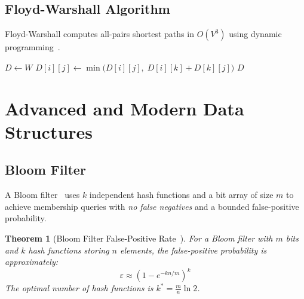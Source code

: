 \documentclass[12pt,a4paper]{article}
\newtheorem{theorem}{Theorem}[section]
\begin{document}
\subsection{Floyd-Warshall Algorithm}

Floyd-Warshall computes all-pairs shortest paths in $O(V^3)$
using dynamic programming~\cite{floyd1962,cormen2022}.

\begin{algorithm}
\caption{Floyd-Warshall All-Pairs Shortest Paths~\cite{floyd1962}}
\begin{algorithmic}[1]
  
  \State $D \leftarrow W$
        \State $D[i][j] \leftarrow \min\!\bigl(D[i][j],\; D[i][k] + D[k][j]\bigr)$
      \EndFor
    \EndFor
  \EndFor
  \Return $D$
\EndProcedure
\end{algorithmic}
\end{algorithm}


\section{Advanced and Modern Data Structures}

\subsection{Bloom Filter}

A Bloom filter~\cite{bloom1970} uses $k$ independent hash functions and a bit array
of size $m$ to achieve membership queries with \emph{no false negatives} and
a bounded false-positive probability.

\begin{theorem}[Bloom Filter False-Positive Rate~\cite{bloom1970}]
For a Bloom filter with $m$ bits and $k$ hash functions storing $n$ elements,
the false-positive probability is approximately:
\[
  \varepsilon \approx \left(1 - e^{-kn/m}\right)^k
\]
The optimal number of hash functions is $k^* = \frac{m}{n}\ln 2$.
\end{theorem}
\end{document}
